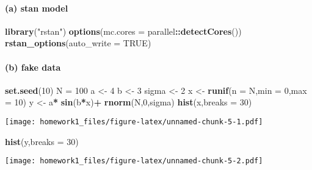\documentclass[]{article}
\newenvironment{Shaded}{\begin{snugshade}}{\end{snugshade}}
\newcommand{\KeywordTok}[1]{\textcolor[rgb]{0.13,0.29,0.53}{\textbf{#1}}}
\newcommand{\DataTypeTok}[1]{\textcolor[rgb]{0.13,0.29,0.53}{#1}}
\newcommand{\DecValTok}[1]{\textcolor[rgb]{0.00,0.00,0.81}{#1}}
\newcommand{\StringTok}[1]{\textcolor[rgb]{0.31,0.60,0.02}{#1}}
\newcommand{\OtherTok}[1]{\textcolor[rgb]{0.56,0.35,0.01}{#1}}
\newcommand{\OperatorTok}[1]{\textcolor[rgb]{0.81,0.36,0.00}{\textbf{#1}}}
\newcommand{\NormalTok}[1]{#1}
\let\oldparagraph\paragraph
\renewcommand{\paragraph}[1]{\oldparagraph{#1}\mbox{}}
\begin{document}
\paragraph{(a) stan model}\label{a-stan-model}

\begin{Shaded}
\begin{Highlighting}[]
\KeywordTok{library}\NormalTok{(}\StringTok{"rstan"}\NormalTok{)}
\KeywordTok{options}\NormalTok{(}\DataTypeTok{mc.cores =}\NormalTok{ parallel}\OperatorTok{::}\KeywordTok{detectCores}\NormalTok{())}
\KeywordTok{rstan_options}\NormalTok{(}\DataTypeTok{auto_write =} \OtherTok{TRUE}\NormalTok{)}
\end{Highlighting}
\end{Shaded}

\paragraph{(b) fake data}\label{b-fake-data}

\begin{Shaded}
\begin{Highlighting}[]
\KeywordTok{set.seed}\NormalTok{(}\DecValTok{10}\NormalTok{)}
\NormalTok{N =}\StringTok{ }\DecValTok{100}
\NormalTok{a <-}\StringTok{ }\DecValTok{4}
\NormalTok{b <-}\StringTok{ }\DecValTok{3}
\NormalTok{sigma <-}\StringTok{ }\DecValTok{2}
\NormalTok{x <-}\StringTok{ }\KeywordTok{runif}\NormalTok{(}\DataTypeTok{n =}\NormalTok{ N,}\DataTypeTok{min =} \DecValTok{0}\NormalTok{,}\DataTypeTok{max =} \DecValTok{10}\NormalTok{)}
\NormalTok{y <-}\StringTok{ }\NormalTok{a}\OperatorTok{*}\StringTok{ }\KeywordTok{sin}\NormalTok{(b}\OperatorTok{*}\NormalTok{x)}\OperatorTok{+}\StringTok{ }\KeywordTok{rnorm}\NormalTok{(N,}\DecValTok{0}\NormalTok{,sigma)}
\KeywordTok{hist}\NormalTok{(x,}\DataTypeTok{breaks =} \DecValTok{30}\NormalTok{)}
\end{Highlighting}
\end{Shaded}

\texttt{[image: homework1\_files/figure-latex/unnamed-chunk-5-1.pdf]}

\begin{Shaded}
\begin{Highlighting}[]
\KeywordTok{hist}\NormalTok{(y,}\DataTypeTok{breaks =} \DecValTok{30}\NormalTok{)}
\end{Highlighting}
\end{Shaded}

\texttt{[image: homework1\_files/figure-latex/unnamed-chunk-5-2.pdf]}
\end{document}
